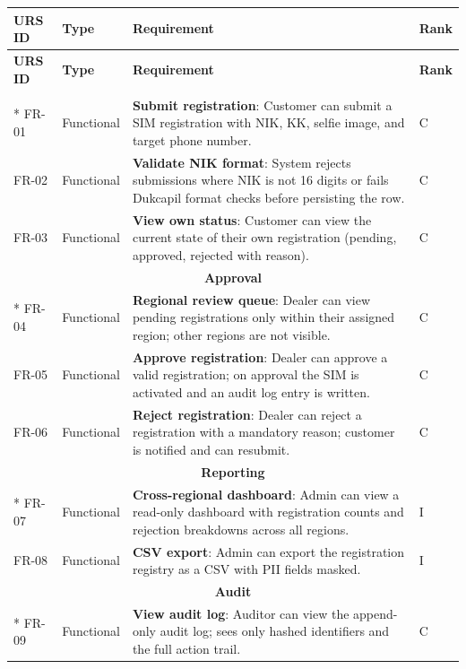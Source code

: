 \documentclass[12pt,a4paper]{article}
\begin{document}
\begin{longtable}{|p{2cm}|p{2.5cm}|p{8cm}|p{1cm}|}
\hline
\textbf{URS ID} & \textbf{Type} & \textbf{Requirement} & \textbf{Rank} \\
\hline
\endfirsthead
\hline
\textbf{URS ID} & \textbf{Type} & \textbf{Requirement} & \textbf{Rank} \\
\hline
\endhead
\hline
\endfoot

\multicolumn{4}{|c|}{\cellcolor{gray!25}\textbf{Registration}} \\*
\hline
FR-01 & Functional & \textbf{Submit registration}: Customer can submit a SIM registration with NIK, KK, selfie image, and target phone number. & C \\
\hline
FR-02 & Functional & \textbf{Validate NIK format}: System rejects submissions where NIK is not 16 digits or fails Dukcapil format checks before persisting the row. & C \\
\hline
FR-03 & Functional & \textbf{View own status}: Customer can view the current state of their own registration (pending, approved, rejected with reason). & C \\
\hline

\multicolumn{4}{|c|}{\cellcolor{gray!25}\textbf{Approval}} \\*
\hline
FR-04 & Functional & \textbf{Regional review queue}: Dealer can view pending registrations only within their assigned region; other regions are not visible. & C \\
\hline
FR-05 & Functional & \textbf{Approve registration}: Dealer can approve a valid registration; on approval the SIM is activated and an audit log entry is written. & C \\
\hline
FR-06 & Functional & \textbf{Reject registration}: Dealer can reject a registration with a mandatory reason; customer is notified and can resubmit. & C \\
\hline

\multicolumn{4}{|c|}{\cellcolor{gray!25}\textbf{Reporting}} \\*
\hline
FR-07 & Functional & \textbf{Cross-regional dashboard}: Admin can view a read-only dashboard with registration counts and rejection breakdowns across all regions. & I \\
\hline
FR-08 & Functional & \textbf{CSV export}: Admin can export the registration registry as a CSV with PII fields masked. & I \\
\hline

\multicolumn{4}{|c|}{\cellcolor{gray!25}\textbf{Audit}} \\*
\hline
FR-09 & Functional & \textbf{View audit log}: Auditor can view the append-only audit log; sees only hashed identifiers and the full action trail. & C \\
\hline

\end{longtable}
\end{document}
